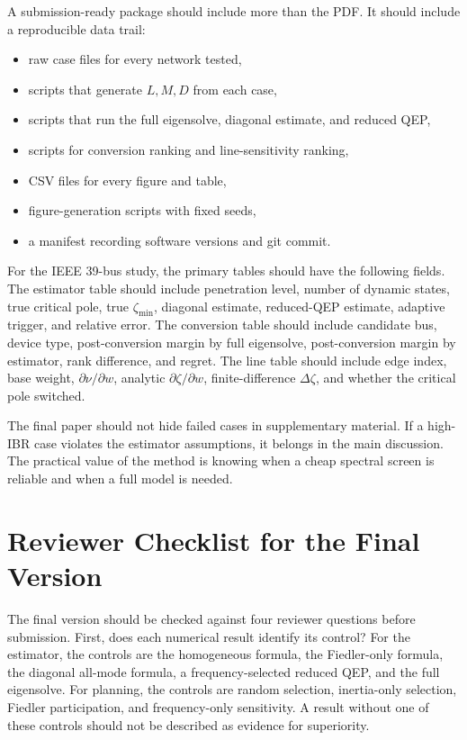 \documentclass[journal]{IEEEtran}
\begin{document}
A submission-ready package should include more than the PDF. It should include a reproducible data trail:
\begin{itemize}
\item raw case files for every network tested,
\item scripts that generate $L,M,D$ from each case,
\item scripts that run the full eigensolve, diagonal estimate, and reduced QEP,
\item scripts for conversion ranking and line-sensitivity ranking,
\item CSV files for every figure and table,
\item figure-generation scripts with fixed seeds,
\item a manifest recording software versions and git commit.
\end{itemize}

For the IEEE 39-bus study, the primary tables should have the following fields. The estimator table should include penetration level, number of dynamic states, true critical pole, true $\zeta_{\min}$, diagonal estimate, reduced-QEP estimate, adaptive trigger, and relative error. The conversion table should include candidate bus, device type, post-conversion margin by full eigensolve, post-conversion margin by estimator, rank difference, and regret. The line table should include edge index, base weight, $\partial\nu/\partial w$, analytic $\partial\zeta/\partial w$, finite-difference $\Delta\zeta$, and whether the critical pole switched.

The final paper should not hide failed cases in supplementary material. If a high-IBR case violates the estimator assumptions, it belongs in the main discussion. The practical value of the method is knowing when a cheap spectral screen is reliable and when a full model is needed.

\section{Reviewer Checklist for the Final Version}

The final version should be checked against four reviewer questions before submission. First, does each numerical result identify its control? For the estimator, the controls are the homogeneous formula, the Fiedler-only formula, the diagonal all-mode formula, a frequency-selected reduced QEP, and the full eigensolve. For planning, the controls are random selection, inertia-only selection, Fiedler participation, and frequency-only sensitivity. A result without one of these controls should not be described as evidence for superiority.
\end{document}

